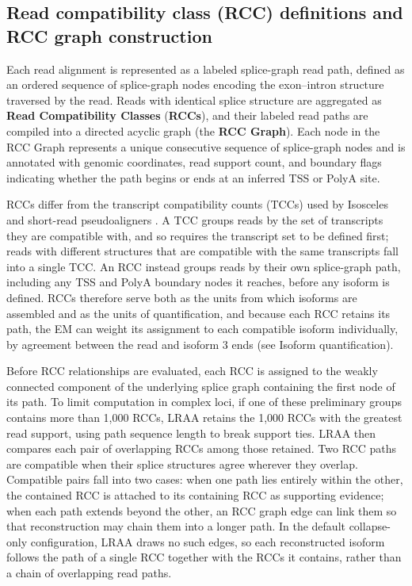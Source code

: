 \subsection{Read compatibility class (RCC) definitions and RCC graph construction}\label{read-compatibility-class-rcc-definitions-and-rcc-graph-construction}

Each read alignment is represented as a labeled splice-graph read path, defined as an ordered sequence of splice-graph nodes encoding the exon--intron structure traversed by the read. Reads with identical splice structure are aggregated as \textbf{Read Compatibility Classes} (\textbf{RCCs}), and their labeled read paths are compiled into a directed acyclic graph (the \textbf{RCC Graph}). Each node in the RCC Graph represents a unique consecutive sequence of splice-graph nodes and is annotated with genomic coordinates, read support count, and boundary flags indicating whether the path begins or ends at an inferred TSS or PolyA site.

RCCs differ from the transcript compatibility counts (TCCs) used by Isosceles and short-read pseudoaligners \citep{ntranos2016, kabza2024, bray2016}. A TCC groups reads by the set of transcripts they are compatible with, and so requires the transcript set to be defined first; reads with different structures that are compatible with the same transcripts fall into a single TCC. An RCC instead groups reads by their own splice-graph path, including any TSS and PolyA boundary nodes it reaches, before any isoform is defined. RCCs therefore serve both as the units from which isoforms are assembled and as the units of quantification, and because each RCC retains its path, the EM can weight its assignment to each compatible isoform individually, by agreement between the read and isoform 3\p{} ends (see Isoform quantification).

Before RCC relationships are evaluated, each RCC is assigned to the weakly connected component of the underlying splice graph containing the first node of its path. To limit computation in complex loci, if one of these preliminary groups contains more than 1,000 RCCs, LRAA retains the 1,000 RCCs with the greatest read support, using path sequence length to break support ties. LRAA then compares each pair of overlapping RCCs among those retained. Two RCC paths are compatible when their splice structures agree wherever they overlap. Compatible pairs fall into two cases: when one path lies entirely within the other, the contained RCC is attached to its containing RCC as supporting evidence; when each path extends beyond the other, an RCC graph edge can link them so that reconstruction may chain them into a longer path. In the default collapse-only configuration, LRAA draws no such edges, so each reconstructed isoform follows the path of a single RCC together with the RCCs it contains, rather than a chain of overlapping read paths.

